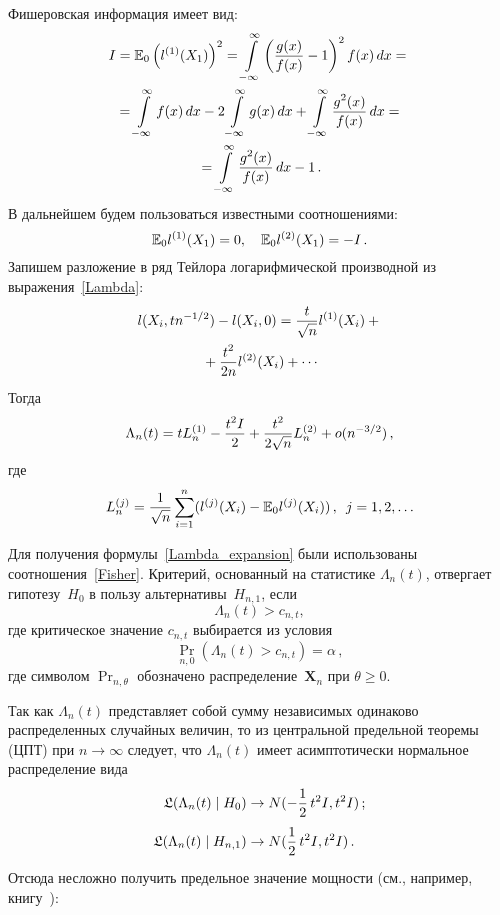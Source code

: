 \begin{multicols}{2}
Фишеровская информация имеет вид:
\begin{multline}
\label{I}
I=\mathbb E_0\left(l^{(1)}(X_1)\right)^2=
\int\limits_{-\infty}^\infty\left(\displaystyle\frac{\displaystyle g(x)\mathstrut}{\displaystyle f(x)\mathstrut}-1\right)^2
f(x)\,dx={}\\
{}=\int\limits_{-\infty}^\infty
f(x)\,dx-2\int\limits_{-\infty}^\infty
g(x)\,dx+\int\limits_{-\infty}^\infty
\displaystyle\frac{\displaystyle g^2(x)\mathstrut}{\displaystyle f(x)\mathstrut}\,dx={}\\
{}=\int\limits_{-\infty}^\infty
\displaystyle\frac{\displaystyle g^2(x)\mathstrut}{\displaystyle f(x)\mathstrut}\,dx-1\,.
\end{multline}
В дальнейшем будем пользоваться известными соотношениями:
\begin{equation}
\label{Fisher} \mathbb E_0 l^{(1)}(X_1)=0,\quad\mathbb E_0 l^{(2)}(X_1)=-I\,.
\end{equation}
Запишем разложение в ряд Тейлора логарифмической
производной из выражения~\eqref{Lambda}:
\begin{multline*}
 l(X_i,tn^{-1/2})-l(X_i,0)=\displaystyle\frac{\displaystyle t\mathstrut}{\displaystyle \sqrt{n}\mathstrut}l^{(1)}(X_i)+{}\\
{}+\displaystyle\frac{\displaystyle t^2\mathstrut}{\displaystyle 2n\mathstrut}l^{(2)}(X_i)+\cdots
\end{multline*}
Тогда
\begin{equation}
\label{Lambda_expansion} 
\Lambda_n(t)=tL_n^{(1)}-\fr{t^2I}{2}+\fr {t^2}{2\sqrt{n}} L_n^{(2)}+o(n^{-3/2})\,,%
\end{equation}
где
\begin{equation*}
\label{Ln1}
L_n^{(j)}=\displaystyle\frac{\displaystyle 1\mathstrut}{\displaystyle \sqrt{n}\mathstrut}\sum\limits_{i=1}^{n}(l^{(j)}(X_i)-\mathbb E_0
l^{(j)}(X_i))\,,\enskip j=1,2,\ldots
\end{equation*}

Для получения формулы~\eqref{Lambda_expansion} были использованы
соотношения~\eqref{Fisher}. Критерий, основанный на статистике
$\Lambda_n(t)$, отвергает гипотезу~$H_0$ в пользу альтернативы~$H_{n,1}$, если
\begin{equation*}
\Lambda_n(t)>c_{n,t},
\end{equation*}
где критическое значение $c_{n,t}$ выбирается из условия
$$
\Pr_{n,0}(\Lambda_n(t)>c_{n,t})=\alpha\,,
$$
где символом $\Pr_{n,\theta}$ обозначено распределение~$\textbf{X}_n$ при $\theta\geqslant0$.

Так как $\Lambda_n(t)$ представляет собой сумму независимых
одинаково распределенных случайных величин, то из центральной
предельной теоремы (ЦПТ) при $n\rightarrow\infty$ следует, что
$\Lambda_n(t)$ имеет асимптотически нормальное распределение вида
\begin{align}
\label{DistrLn1} 
\mathfrak{L}(\Lambda_n(t)\mid H_0)&\rightarrow
N(-\displaystyle\frac{\displaystyle 1\mathstrut}{\displaystyle 2\mathstrut}\,t^2I,t^2I)\,;\\
\label{DistrLn2}
\mathfrak{L}(\Lambda_n(t)\mid H_{n,1})&\rightarrow
N(\displaystyle\frac{\displaystyle 1\mathstrut}{\displaystyle 2\mathstrut}\,t^2I,t^2I)\,.
\end{align}
Отсюда несложно получить предельное значение мощности (см.,
например, книгу~\cite{Bening2000}):


\end{multicols}
